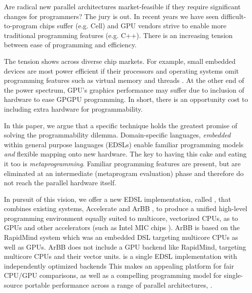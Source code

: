 Are radical new parallel architectures market-feasible if they require
significant changes for programmers?  The jury is out.  In recent
years we have seen difficult-to-program chips suffer 
(e.g. Cell)
and
GPU vendors strive to enable more traditional programming features
\cite{fermi} (e.g. C++).  There is an increasing
tension between ease of programming and efficiency.

The tension  shows  across diverse chip markets.  For example,
small embedded devices are most power efficient if their processors and operating systems
omit programming features such as virtual memory and threads \cite{tinyos}.  
At the other end of the power spectrum, GPU's
graphics performance may suffer due to inclusion of hardware to ease
GPGPU programming.  In short, there is an opportunity cost to
including extra hardware for programmability.

In this paper, we argue 
that a specific technique holds the greatest promise of solving the programmability dilemma.
%
Domain-specific languages, {\em embedded} within general purpose
languages (EDSLs) 
 enable familiar programming models 
{\em and} flexible
mapping onto new hardware.  The key to having this cake and eating it
too is {\em metaprogramming}.  Familiar programming features are
present, but are eliminated at an intermediate (metaprogram evaluation)
phase and therefore do not reach the parallel hardware itself.


In pursuit of this vision, we offer a
% 
 new EDSL implementation, called \accarbb{}, that combines
existing systems, Accelerate \cite{Accelerate} and ArBB \cite{ArBB}, to produce a unified
high-level programming environment equally suited to multicore,
vectorized CPUs, as to GPUs and other accelerators (such as Intel MIC chips \cite{larrabee}).
%
ArBB is based on the RapidMind \cite{RapidMind} system which was an embedded 
DSL targeting multicore CPUs as well as GPUs. ArBB does not  include a GPU 
backend like RapidMind, targeting multicore CPUs and their vector 
units. 
\fi{}
\systemname{} is a single EDSL implementation 
with independently optimized backends 
This makes
\systemname{} an appealing platform for fair CPU/GPU comparisons, 
as well as a compelling programming model for single-source portable performance across a range of
parallel architectures, .


